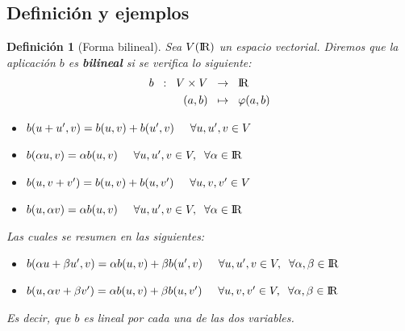 \documentclass[10pt, a4paper]{article}
\theoremstyle{theorem-style}
\theoremstyle{definition-style}
\newtheorem{ndef}{Definición}[section]
\theoremstyle{remark-style}
\theoremstyle{example-style}
\theoremstyle{definition-style}
\theoremstyle{remark-style}
\begin{document}
\subsection{Definición y ejemplos}

\begin{ndef}[Forma bilineal]
  Sea $V(\rm I\!R) $ un espacio vectorial. Diremos que la aplicación $b$ es \textbf{bilineal} si se verifica lo siguiente:
   \begin{align*}
    b \hspace{2mm} : \hspace{2mm} V \times V \hspace{2mm} &\rightarrow \hspace{2mm} \rm I\!R \\
    (a,b) \hspace{2mm} & \mapsto \hspace{2mm} \varphi(a,b)
  \end{align*}
  \begin{itemize}
  \item[(1.1)] $b(u+u',v)=b(u,v)+b(u',v) \hspace{0.5cm} \forall u, u', v \in V $
  \item[(1.2)] $b(\alpha u,v)=\alpha b(u,v) \hspace{0.5cm} \forall u, u', v \in V,\hspace{0.2cm} \forall \alpha \in \rm I\!R $
  \item[(2.1)] $b(u,v+v')=b(u,v)+b(u,v') \hspace{0.5cm} \forall u, v, v' \in V $
  \item[(2.2)] $b(u,\alpha v)=\alpha b(u,v) \hspace{0.5cm} \forall u, u', v \in V,\hspace{0.2cm} \forall \alpha \in \rm I\!R $
  \end{itemize}
Las cuales se resumen en las siguientes:
  \begin{itemize}
  \item[(1)] $b(\alpha u+\beta u',v)=\alpha b(u,v)+ \beta b(u',v) \hspace{0.5cm} \forall u, u', v \in V,\hspace{0.2cm} \forall \alpha, \beta \in \rm I\!R$
  \item[(2)] $b(u,\alpha v+\beta v')=\alpha b(u,v)+ \beta b(u,v') \hspace{0.5cm} \forall u, v, v' \in V,\hspace{0.2cm} \forall \alpha, \beta \in \rm I\!R$
  \end{itemize}
  Es decir, que $b$ es lineal por cada una de las dos variables.
\end{ndef}
\end{document}
